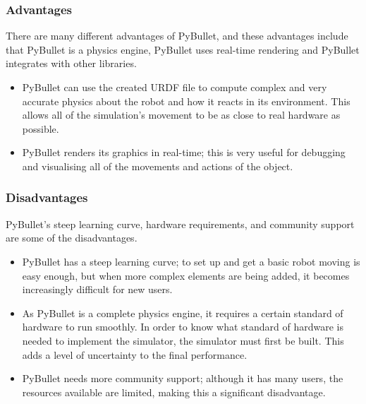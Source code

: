 \documentclass[a4paper,12pt]{article}
\begin{document}
\subsubsection{Advantages}

There are many different advantages of PyBullet, and these advantages include that PyBullet is a physics engine, PyBullet uses real-time rendering and PyBullet integrates with other libraries.

\begin{itemize}
  \item PyBullet can use the created URDF file to compute complex and very accurate physics about the robot and how it reacts in its environment. This allows all of the simulation's movement to be as close to real hardware as possible.

  \item PyBullet renders its graphics in real-time; this is very useful for debugging and visualising all of the movements and actions of the object.

\end{itemize}

\subsubsection{Disadvantages}

PyBullet's steep learning curve, hardware requirements, and community support are some of the disadvantages. 
\begin{itemize}
  \item PyBullet has a steep learning curve; to set up and get a basic robot moving is easy enough, but when more complex elements are being added, it becomes increasingly difficult for new users.
  \item As PyBullet is a complete physics engine, it requires a certain standard of hardware to run smoothly. In order to know what standard of hardware is needed to implement the simulator, the simulator must first be built. This adds a level of uncertainty to the final performance.
  \item PyBullet needs more community support; although it has many users, the resources available are limited, making this a significant disadvantage. 

\end{itemize}
 
\end{document}
